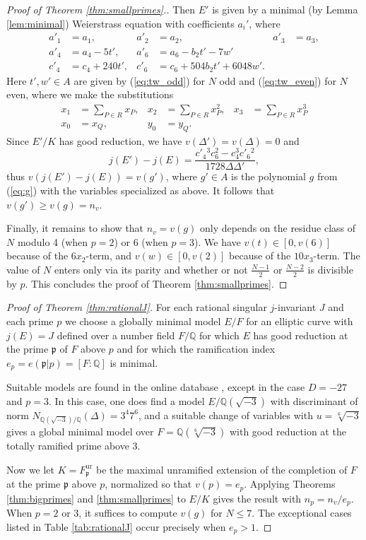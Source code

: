 \documentclass[11pt]{amsart}
\theoremstyle{definition}
\newcommand{\ur}{\mathrm{ur}}
\def\BQ{\mathbb{Q}}
\def\Fp{\mathfrak{p}}
\begin{document}
\begin{proof}[Proof of Theorem \ref{thm:smallprimes}.]
    Then $E'$ is given by a minimal (by Lemma \ref{lem:minimal}) Weierstrass equation with coefficients $a_i'$, where
    \begin{align*}
        a'_1 &= a_1, & a'_2 &= a_2, & a'_3 &= a_3, \\
        a'_4 &= a_4 - 5t', & a'_6 &= a_6 -b_2t'-7w' \\
        c'_4 &= c_4 + 240t', & c'_6 &= c_6 + 504b_2t' + 6048w'.
    \end{align*}
    Here $t', w' \in A$ are given by (\ref{eq:tw_odd}) for $N$ odd and (\ref{eq:tw_even}) for $N$ even, where we make the substitutions 
    \begin{align*}
        x_1 & = \sum_{P\in R} x_P, & x_2&= \sum_{P\in R}x_P^2, & x_3 & = \sum_{P\in R}x_P^3 \\
        x_0 &= x_Q, & y_0 &= y_Q. 
    \end{align*}
    Since $E'/K$ has good reduction, we have $v(\Delta')=v(\Delta)=0$ and
    \[
    j(E') - j(E) = \frac{c'_4{}^3c_6^2 - c_4^3c'_6{}^2}{1728\Delta\Delta'},
    \]
    thus $v(j(E')-j(E)) = v(g')$, where $g'\in A$ is the polynomial $g$ from (\ref{eq:g}) with the variables specialized as above. It follows that 
    $v(g') \geq v(g) = n_v$.

    Finally, it remains to show that $n_v = v(g)$ only depends on the residue class of $N$ modulo 4 (when $p=2$) or 6 (when $p=3$). We have $v(t) \in [0,v(6)]$ because of the $6x_2$-term, and $v(w)\in [0,v(2)]$ because of the $10x_3$-term. The value of $N$ enters only via its parity and whether or not $\frac{N-1}{2}$ or $\frac{N-2}{2}$ is divisible by $p$. This concludes the proof of Theorem \ref{thm:smallprimes}.
\end{proof}

\begin{proof}[Proof of Theorem \ref{thm:rationalJ}]
    For each rational singular $j$-invariant $J$ and each prime $p$ we choose a globally minimal model $E/F$ 
    for an elliptic curve with $j(E)=J$ defined over a number field $F/\BQ$ for which
    $E$ has good reduction at the prime $\Fp$ of $F$ above $p$ and for which the ramification index $e_p = e(\Fp|p) = [F:\BQ]$ is minimal.

    Suitable models are found in the online database \cite{lmfdb}, except in the case $D=-27$ and $p=3$. In this case, one does find a model $E/\BQ(\sqrt{-3})$ with discriminant of norm $N_{\BQ(\sqrt{-3})/\BQ}(\Delta) = 3^{4}7^{6}$, and a suitable change of variables with $u=\sqrt[6]{-3}$ gives a global minimal model over $F=\BQ(\sqrt[6]{-3})$ with good reduction at the totally ramified prime above $3$. 

    Now we let $K = F_{\Fp}^{\ur}$ be the maximal unramified extension of the completion of $F$ at the prime $\Fp$ above $p$, normalized so that $v(p) = e_p$. Applying Theorems \ref{thm:bigprimes} and \ref{thm:smallprimes} to $E/K$ gives the result with $n_p = n_v/e_p$. When $p=2$ or $3$, it suffices to compute $v(g)$ for $N \leq 7$. The exceptional cases listed in Table \ref{tab:rationalJ} occur precisely when $e_p > 1$.
\end{proof}
\end{document}
